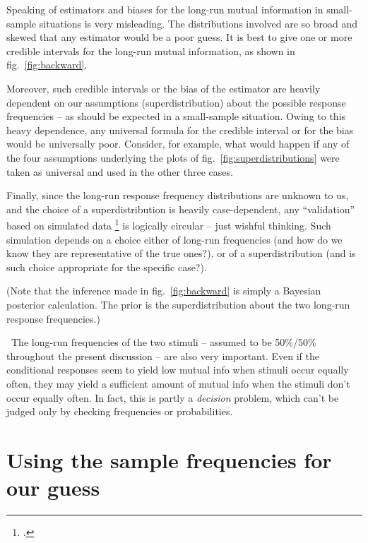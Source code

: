 \documentclass[\ifafour a4paper,12pt,\else a5paper,10pt,\fi%
onecolumn,oneside,article,%
british%
]{memoir}
\theoremstyle{remark}
\theoremstyle{innote}
\newcommand*{\citep}{\footcites}
\renewcommand*{\|}[1][]{\nonscript\,#1\vert\nonscript\;\mathopen{}}
\renewcommand*{\=}{\TextOrMath\texteq\eq}
\newcommand*{\fig}{fig.}%
\newcommand*{\cf}{{cf.}}
\newcommand*{\puzzle}{{\fontencoding{U}\fontfamily{fontawesometwo}\selectfont\symbol{225}}}
\newcommand{\mynote}[1]{ {\color{notecolour}\puzzle\ #1}}
\begin{document}
Speaking of estimators and biases for the long-run mutual information in
small-sample situations is very misleading. The distributions involved are
so broad and skewed that any estimator would be a poor guess. It is best to
give one or more credible intervals for the long-run mutual information, as
shown in \fig~\ref{fig:backward}.

Moreover, such credible intervals or the bias of the estimator are heavily
dependent on our assumptions (superdistribution) about the possible
response frequencies -- as should be expected in a small-sample situation.
Owing to this heavy dependence, any universal formula for the credible
interval or for the bias would be universally poor. Consider, for example,
what would happen if any of the four assumptions underlying the plots of
\fig~\ref{fig:superdistributions} were taken as universal and used in the
other three cases.

Finally, since the long-run response frequency distributions are unknown to
us, and the choice of a superdistribution is heavily case-dependent, any
\enquote{validation} based on simulated data \citep[\cf][\emph{Comparing
  procedures to correct for the bias}]{panzerietal2007} is logically
circular -- just wishful thinking. Such simulation depends on a choice either of
long-run frequencies (and how do we know they are representative of the
true ones?), or of a superdistribution (and is such choice appropriate for
the specific case?).


\medskip

(Note that the inference made in \fig~\ref{fig:backward} is simply a
Bayesian posterior calculation. The prior is the superdistribution about
the two long-run response frequencies.)

\mynote{The long-run frequencies of the two stimuli -- assumed to
  be 50\%/50\% throughout the present discussion -- are also very
  important. Even if the conditional responses seem to yield low mutual
  info when stimuli occur equally often, they may yield a sufficient amount
  of mutual info when the stimuli don't occur equally often. In fact, this
  is partly a \emph{decision} problem, which can't be judged only by
  checking frequencies or probabilities.}


\section{Using the sample frequencies for our guess}
\label{sec:guess_from_freqs}
\end{document}
